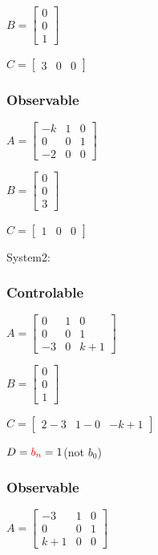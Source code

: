 \documentclass[12pt,a4paper,oneside]{ctexart}
\begin{document}
    $B = \begin{bmatrix}
        0\\
        0\\
        1
    \end{bmatrix}$

    $C = \begin{bmatrix}
        3&0&0
    \end{bmatrix}$

    \subsubsection*{Observable}
    $A = \begin{bmatrix}
        -k&1&0\\
        0&0&1\\
        -2&0&0
    \end{bmatrix}$

    $B = \begin{bmatrix}
        0\\
        0\\
        3
    \end{bmatrix}$

    $C = \begin{bmatrix}
        1&0&0
    \end{bmatrix}$

    \newpage
    System2:
    \subsubsection*{Controlable}
    $A = \begin{bmatrix}
        0&1&0\\
        0&0&1\\
        -3&0&k+1
    \end{bmatrix}$

    $B = \begin{bmatrix}
        0\\
        0\\
        1
    \end{bmatrix}$

    $C = \begin{bmatrix}
        2-3&1-0&-k+1
    \end{bmatrix}$

    $D = \textcolor{red}{b_n} = 1$(not $b_0$)

    \subsubsection*{Observable}
    $A = \begin{bmatrix}
        -3&1&0\\
        0&0&1\\
        k+1&0&0
    \end{bmatrix}$
\end{document}
